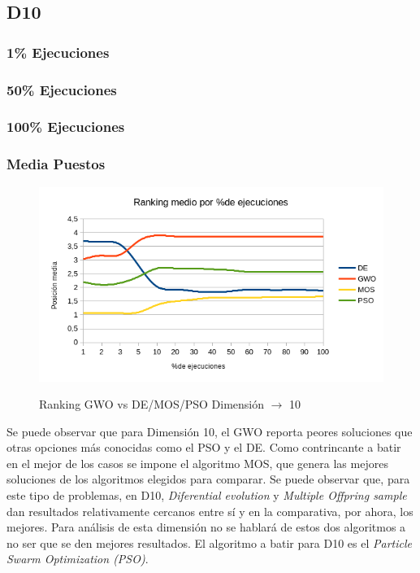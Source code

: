\documentclass[a4paper]{report}
\begin{document}
\subsection{D10}

\subsubsection*{1\% Ejecuciones}

\subsubsection*{50\% Ejecuciones}


\subsubsection*{100\% Ejecuciones}




\subsubsection*{Media Puestos}



\begin{figure}[H]

    \caption{Ranking GWO vs DE/MOS/PSO Dimensión $\rightarrow$ 10}

    \includegraphics[width=1\textwidth]{Resultados/basico/d10/Grafico_puestos.png} \label{img:ranking-D10}
\end{figure}

Se puede observar que para Dimensión 10, el GWO reporta peores soluciones que otras opciones más conocidas como el PSO y el DE. Como contrincante a batir en el mejor de los casos se impone el algoritmo MOS, que genera las mejores soluciones de los algoritmos elegidos para comparar. Se puede observar que, para este tipo de problemas, en D10, \textit{Diferential evolution} y \textit{Multiple Offpring sample} dan resultados relativamente cercanos entre sí y en la comparativa, por ahora, los mejores. Para análisis de esta dimensión no se hablará de estos dos algoritmos a no ser que se den mejores resultados. El algoritmo a batir para D10 es el \textit{Particle Swarm Optimization (PSO)}.
\end{document}
